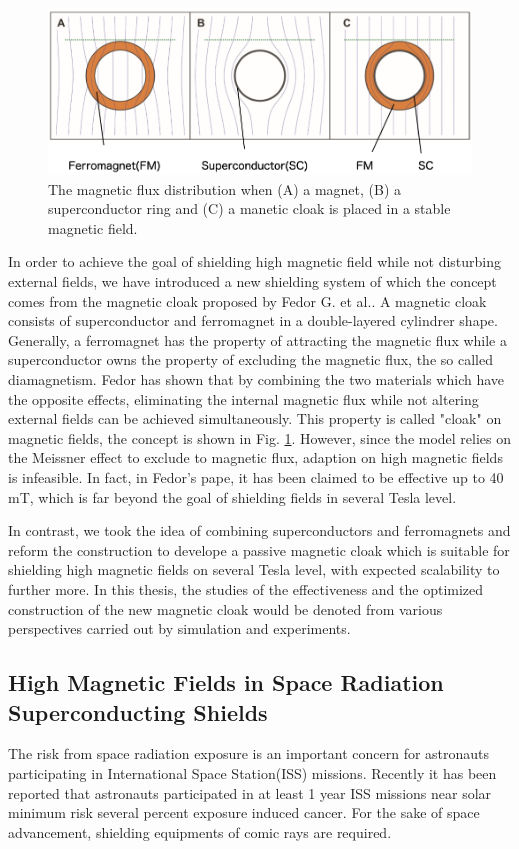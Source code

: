 \begin{figure}[H]
  \includegraphics[width=18cm, bb=9 9 900 350]{./section1Introduction/cloak.png}
  \caption{The magnetic flux distribution when (A) a magnet, (B) a superconductor ring and (C) a manetic cloak is placed in a stable magnetic field.}
  \label{fig:cloak}
\end{figure}

In order to achieve the goal of shielding high magnetic field while not disturbing external fields,
we have introduced a new shielding system of which the concept comes from the magnetic cloak proposed by Fedor G. et al.\cite{1_1_6}.
A magnetic cloak consists of superconductor and ferromagnet in a double-layered cylindrer shape.
Generally, a ferromagnet has the property of attracting the magnetic flux while a superconductor owns the property of excluding the magnetic flux, the so called diamagnetism.
Fedor has shown that by combining the two materials which have the opposite effects,
eliminating the internal magnetic flux while not altering external fields can be achieved simultaneously.
This property is called "cloak" on magnetic fields, the concept is shown in Fig. \ref{fig:cloak}.
However, since the model relies on the Meissner effect to exclude to magnetic flux,
adaption on high magnetic fields is infeasible.
In fact, in Fedor's pape, it has been claimed to be effective up to 40 mT, which is far beyond the goal of shielding fields in several Tesla level.


In contrast, we took the idea of combining superconductors and ferromagnets and reform the construction to develope a passive magnetic cloak
which is suitable for shielding high magnetic fields on several Tesla level,
with expected scalability to further more.
In this thesis, the studies of the effectiveness and the optimized construction of the new magnetic cloak would be denoted
from various perspectives carried out by simulation and experiments.

\newpage
\subsection{High Magnetic Fields in Space Radiation Superconducting Shields}
The risk from space radiation exposure is an important concern for astronauts participating in International Space Station(ISS) missions.
Recently it has been reported that astronauts participated in at least 1 year ISS missions near solar minimum risk several percent exposure induced cancer.
For the sake of space advancement, shielding equipments of comic rays are required.


